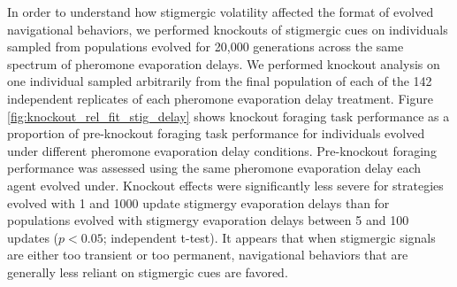 In order to understand how stigmergic volatility affected the format of evolved navigational behaviors, we performed knockouts of stigmergic cues on individuals sampled from populations evolved for 20,000 generations across the same spectrum of pheromone evaporation delays.
We performed knockout analysis on one individual sampled arbitrarily from the final population of each of the 142 independent replicates of each pheromone evaporation delay treatment.
Figure \ref{fig:knockout_rel_fit_stig_delay} shows knockout foraging task performance as a proportion of pre-knockout foraging task performance for individuals evolved under different pheromone evaporation delay conditions.
Pre-knockout foraging performance was assessed using the same pheromone evaporation delay each agent evolved under.
Knockout effects were significantly less severe for strategies evolved with 1 and 1000 update stigmergy evaporation delays than for populations evolved with stigmergy evaporation delays between 5 and 100 updates ($p < 0.05$; independent t-test).
It appears that when stigmergic signals are either too transient or too permanent, navigational behaviors that are generally less reliant on stigmergic cues are favored.

